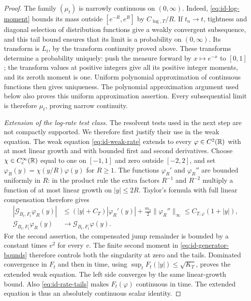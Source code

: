 \begin{proof}
The family $(\mu_t)$ is narrowly continuous on $(0,\infty)$.
Indeed, \eqref{eq:id-log-moment} bounds its mass outside $[e^{-R},e^R]$ by $C_{\log,T}/R$.
If $t_n\to t$, tightness and diagonal selection of distribution functions give a weakly convergent subsequence, and this tail bound ensures that its limit is a probability on $(0,\infty)$.
Its transform is $L_t$, by the transform continuity proved above.
These transforms determine a probability uniquely: push the measure forward by $x\mapsto e^{-x}$ to $[0,1]$; the transform values at positive integers give all its positive integer moments, and its zeroth moment is one.
Uniform polynomial approximation of continuous functions then gives uniqueness.
The polynomial approximation argument used below also proves this uniform approximation assertion.
Every subsequential limit is therefore $\mu_t$, proving narrow continuity.

\medskip\noindent\emph{Extension of the log-rate test class.}
The resolvent tests used in the next step are not compactly supported.
We therefore first justify their use in the weak equation.
The weak equation \eqref{eq:id-weak-rate} extends to every $\varphi\in C^2(\mathbb R)$ with at most linear growth and with bounded first and second derivatives.
Choose $\chi\in C_c^\infty(\mathbb R)$ equal to one on $[-1,1]$ and zero outside $[-2,2]$, and set $\varphi_R(y)=\chi(y/R)\varphi(y)$ for $R\ge1$.
The functions $\varphi_R'$ and $\varphi_R''$ are bounded uniformly in $R$: in the product rule the extra factors $R^{-1}$ and $R^{-2}$ multiply a function of at most linear growth on $|y|\le2R$.
Taylor's formula with full linear compensation therefore gives
\begin{equation}
 \begin{aligned}
 |\mathcal G_{B_t,F_t}\varphi_R(y)|
 &\le (|y|+C_T)|\varphi_R'(y)|
       +\frac{m_2}{2}\|\varphi_R''\|_\infty
 \le C_{T,\varphi}(1+|y|),\\
 \mathcal G_{B_t,F_t}\varphi_R(y)
 &\longrightarrow\mathcal G_{B_t,F_t}\varphi(y).
 \end{aligned}
 \label{eq:id-domain-extension}
\end{equation}
For the second assertion, the compensated jump remainder is bounded by a constant times $v^2$ for every $v$.
The finite second moment in \eqref{eq:id-generator-bounds} therefore controls both the singularity at zero and the tails.
Dominated convergence in $F_t$ and then in time, using $\sup_tF_t(|y|)\le\sqrt{K_T}$, proves the extended weak equation.
The left side converges by the same linear-growth bound.
Also \eqref{eq:id-rate-tails} makes $F_t(\varphi)$ continuous in time.
The extended equation is thus an absolutely continuous scalar identity.


\end{proof}
